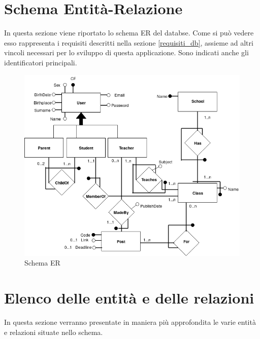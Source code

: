 \documentclass[Lau, binding=0.6cm, oneside]{sapthesis}
\begin{document}
\section{Schema Entità-Relazione}
In questa sezione viene riportato lo schema ER del databse. Come si può vedere esso rappresenta i requisiti descritti nella sezione \ref{requisiti_db}, assieme ad altri vincoli necessari per lo sviluppo di questa applicazione.
Sono indicati anche gli identificatori principali.

\begin{figure}[H]
	\centering
	\includegraphics[width=1\linewidth]{images/db_HiSchool.png} 
	\caption{Schema ER}
	\label{fig:schema_ER}
\end{figure}

\section{Elenco delle entità e delle relazioni}

In questa sezione verranno presentate in maniera più approfondita le varie entità e relazioni situate nello schema.
\end{document}
